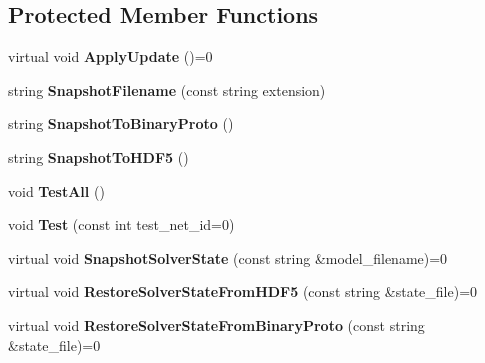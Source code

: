 \subsection*{Protected Member Functions}
\begin{DoxyCompactItemize}
\item 
virtual void {\bfseries Apply\+Update} ()=0\hypertarget{classcaffe_1_1Solver_a798f08452f76d3c328e95fa0acdb2b4d}{}\label{classcaffe_1_1Solver_a798f08452f76d3c328e95fa0acdb2b4d}

\item 
string {\bfseries Snapshot\+Filename} (const string extension)\hypertarget{classcaffe_1_1Solver_aa05c6b201186bf8425c7b3cdd173daa8}{}\label{classcaffe_1_1Solver_aa05c6b201186bf8425c7b3cdd173daa8}

\item 
string {\bfseries Snapshot\+To\+Binary\+Proto} ()\hypertarget{classcaffe_1_1Solver_ad80ddf6a4dee3706ea91be22bcb1273a}{}\label{classcaffe_1_1Solver_ad80ddf6a4dee3706ea91be22bcb1273a}

\item 
string {\bfseries Snapshot\+To\+H\+D\+F5} ()\hypertarget{classcaffe_1_1Solver_ab6640d8667ba3cb6e492c83c8f8943fc}{}\label{classcaffe_1_1Solver_ab6640d8667ba3cb6e492c83c8f8943fc}

\item 
void {\bfseries Test\+All} ()\hypertarget{classcaffe_1_1Solver_ac952acb7d33593bac88173ec31481647}{}\label{classcaffe_1_1Solver_ac952acb7d33593bac88173ec31481647}

\item 
void {\bfseries Test} (const int test\+\_\+net\+\_\+id=0)\hypertarget{classcaffe_1_1Solver_a9364674374a00fa60cfa7627cce99894}{}\label{classcaffe_1_1Solver_a9364674374a00fa60cfa7627cce99894}

\item 
virtual void {\bfseries Snapshot\+Solver\+State} (const string \&model\+\_\+filename)=0\hypertarget{classcaffe_1_1Solver_a521bf1546c71c27bec8e33c91eebdfe9}{}\label{classcaffe_1_1Solver_a521bf1546c71c27bec8e33c91eebdfe9}

\item 
virtual void {\bfseries Restore\+Solver\+State\+From\+H\+D\+F5} (const string \&state\+\_\+file)=0\hypertarget{classcaffe_1_1Solver_ae9d89820d020a5f26460183d7f67009e}{}\label{classcaffe_1_1Solver_ae9d89820d020a5f26460183d7f67009e}

\item 
virtual void {\bfseries Restore\+Solver\+State\+From\+Binary\+Proto} (const string \&state\+\_\+file)=0\hypertarget{classcaffe_1_1Solver_ab532eca6ca2b9c8e9374ed8c582f7957}{}\label{classcaffe_1_1Solver_ab532eca6ca2b9c8e9374ed8c582f7957}


\end{DoxyCompactItemize}
